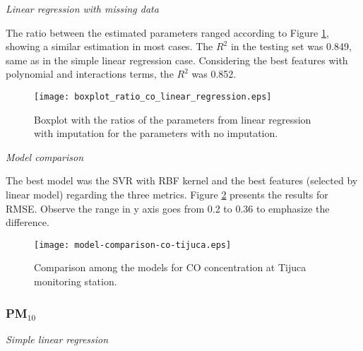 \vspace{2mm}

{\em Linear regression with missing data} 

\vspace{2mm}

The ratio between the estimated parameters ranged according to Figure
\ref{fig:boxplot-co-linear-regression}, showing a similar estimation in most cases. The $R^2$ in the testing set was
0.849, same as in the simple
linear regression case. Considering the best features with polynomial and
interactions terms, the $R^2$ was 0.852.

\begin{figure}
    \centering
    \texttt{[image: boxplot\_ratio\_co\_linear\_regression.eps]}
    \caption{Boxplot with the ratios of the parameters from linear regression
    with imputation for the parameters with no imputation.}
    \label{fig:boxplot-co-linear-regression}
\end{figure}

\vspace{2mm}

\vspace{2mm}

{\em Model comparison} 

\vspace{2mm}

The best model was the SVR with RBF kernel and the best features
(selected by linear model) regarding the three metrics. Figure
\ref{fig:model-comparison-co-tijuca} presents the results for RMSE. Observe
the range in y axis goes from 0.2 to 0.36 to emphasize the difference.

\begin{figure}
    \centering
    \texttt{[image: model-comparison-co-tijuca.eps]}
    \caption{Comparison among the models for CO concentration at Tijuca monitoring station.}
    \label{fig:model-comparison-co-tijuca}
\end{figure}


\subsubsection{PM\texorpdfstring{$_{10}$}{10}}

{\em Simple linear regression}

\vspace{2mm}

